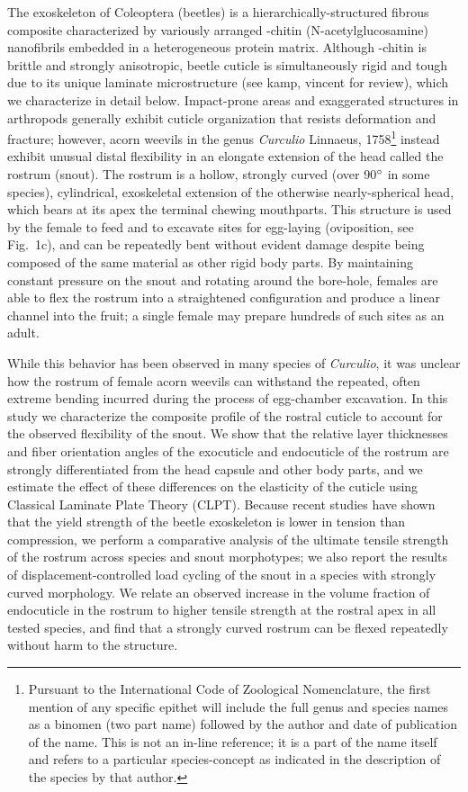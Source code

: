 \documentclass[twocolumn, linenumbers, superscriptaddress, nofootinbib]{revtex4-1}
\begin{document}
	{The exoskeleton of Coleoptera (beetles) is a hierarchically-structured fibrous composite characterized by variously arranged \textalpha-chitin (N-acetylglucosamine) nanofibrils embedded in a heterogeneous protein matrix.
	Although \textalpha-chitin is brittle and strongly anisotropic, beetle cuticle is simultaneously rigid and tough due to its unique laminate microstructure (see kamp, vincent for review), which we characterize in detail below.
	Impact-prone areas and exaggerated structures in arthropods generally exhibit cuticle organization that resists deformation and fracture; however, acorn weevils in the genus \textit{Curculio} Linnaeus, 1758\footnote{
		Pursuant to the International Code of Zoological Nomenclature, the first mention of any specific epithet will include the full genus and species names as a binomen (two part name) followed by the author and date of publication of the name.
		This is not an in-line reference; it is a part of the name itself and refers to a particular species-concept as indicated in the description of the species by that author.}
	instead exhibit unusual distal flexibility in an elongate extension of the head called the rostrum (snout).
	The rostrum is a hollow, strongly curved (over 90$\degree$ in some species), cylindrical, exoskeletal extension of the otherwise nearly-spherical head, which bears at its apex the terminal chewing mouthparts.
	This structure is used by the female to feed and to excavate sites for egg-laying (oviposition, see Fig.~1c), and can be repeatedly bent without evident damage despite being composed of the same material as other rigid body parts.
	By maintaining constant pressure on the snout and rotating around the bore-hole, females are able to flex the rostrum into a straightened configuration and produce a linear channel into the fruit; a single female may prepare hundreds of such sites as an adult.
	
	While this behavior has been observed in many species of \textit{Curculio}, it was unclear how the rostrum of female acorn weevils can withstand the repeated, often extreme bending incurred during the process of egg-chamber excavation.
	In this study we characterize the composite profile of the rostral cuticle to account for the observed flexibility of the snout.
	We show that the relative layer thicknesses and fiber orientation angles of the exocuticle and endocuticle of the rostrum are strongly differentiated from the head capsule and other body parts, and we estimate the effect of these differences on the elasticity of the cuticle using Classical Laminate Plate Theory (CLPT).
	Because recent studies have shown that the yield strength of the beetle exoskeleton is lower in tension than compression, we perform a comparative analysis of the ultimate tensile strength of the rostrum across species and snout morphotypes; we also report the results of displacement-controlled load cycling of the snout in a species with strongly curved morphology.
	We relate an observed increase in the volume fraction of endocuticle in the rostrum to higher tensile strength at the rostral apex in all tested species, and find that a strongly curved rostrum can be flexed repeatedly without harm to the structure.
	
}
\end{document}
